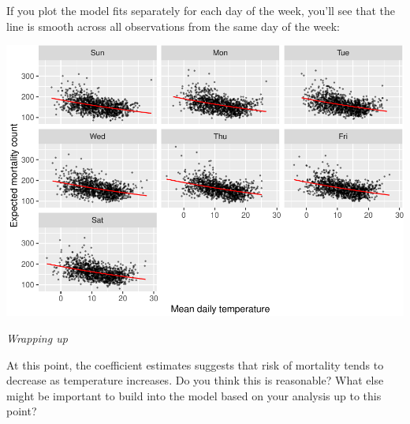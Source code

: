\documentclass[
]{book}
\newenvironment{Shaded}{\begin{snugshade}}{\end{snugshade}}
\newcommand{\DataTypeTok}[1]{\textcolor[rgb]{0.13,0.29,0.53}{#1}}
\newcommand{\FloatTok}[1]{\textcolor[rgb]{0.00,0.00,0.81}{#1}}
\newcommand{\KeywordTok}[1]{\textcolor[rgb]{0.13,0.29,0.53}{\textbf{#1}}}
\newcommand{\NormalTok}[1]{#1}
\newcommand{\OperatorTok}[1]{\textcolor[rgb]{0.81,0.36,0.00}{\textbf{#1}}}
\newcommand{\StringTok}[1]{\textcolor[rgb]{0.31,0.60,0.02}{#1}}
\begin{document}
If you plot the model fits separately for each day of the week, you'll see that
the line is smooth across all observations from the same day of the week:

\begin{Shaded}
\end{Shaded}

\includegraphics{adv_epi_analysis_files/figure-latex/unnamed-chunk-41-1.pdf}

\emph{Wrapping up}

At this point, the coefficient estimates suggests that risk of mortality
tends to decrease as temperature increases. Do you think this is reasonable?
What else might be important to build into the model based on your analysis
up to this point?
\end{document}
